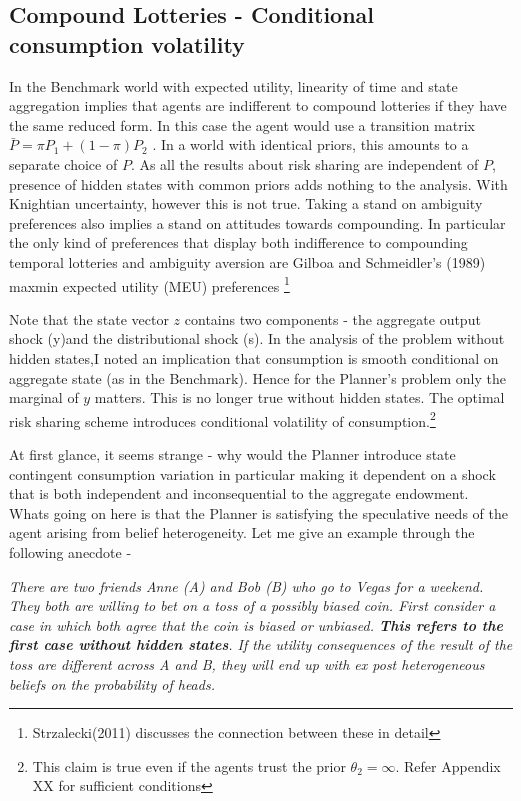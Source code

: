\documentclass[12pt]{article}
\begin{document}
\subsection{Compound Lotteries  - Conditional consumption volatility}

\noindent In the Benchmark world with expected utility, linearity of time and state aggregation implies that agents are indifferent to compound lotteries if they have the same reduced form.  In this case  the agent would use a transition matrix $\bar{P} = \pi P_1+(1-\pi) P_2$ . In a world with identical priors, this amounts to a separate choice of $P$. As all the results about risk sharing are independent of $P$, presence of hidden states with common priors adds nothing to the analysis. With Knightian uncertainty, however this is not true. Taking a stand on ambiguity preferences also implies a stand on attitudes towards compounding.  In particular the only kind of preferences that display both indifference to compounding temporal lotteries and ambiguity aversion are Gilboa and Schmeidler's (1989) maxmin expected utility (MEU) preferences \footnote{Strzalecki(2011) discusses the connection between these in detail}


\noindent Note that the state vector $z$ contains two components - the aggregate output shock (y)and the distributional shock (s). In the analysis of the problem without hidden states,I noted an implication that consumption is smooth conditional on aggregate state (as in the Benchmark). Hence for the Planner's problem only the marginal of $y$ matters.  This is no longer true without hidden states. The optimal risk sharing scheme introduces conditional volatility of consumption.\footnote{This claim is true even if the agents trust the prior $\theta_2=\infty$. Refer Appendix XX for sufficient conditions}

\noindent At first glance, it seems strange - why would the Planner introduce state contingent consumption variation in particular making it dependent  on a shock that is both independent and inconsequential to the aggregate endowment.  Whats going on here is that the Planner is satisfying the speculative needs of the agent arising from belief heterogeneity. Let me give an example through the following anecdote - 

\noindent \emph{There are two friends Anne (A) and Bob (B) who go to Vegas for a weekend. They both are willing to bet on a toss of a possibly biased coin. First consider a case in which both agree that the coin is biased or unbiased. \textbf{This refers to the first case without hidden states}.  If the utility consequences of the result of the toss are different across A and B, they will end up with ex post heterogeneous beliefs on the probability of heads.}
\end{document}
